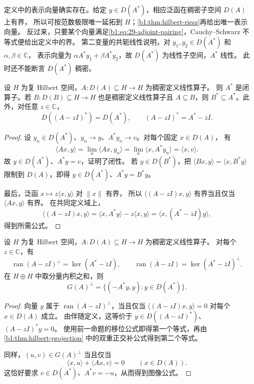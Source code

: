 定义中的表示向量确实存在。给定 \(y\in D(A^*)\)，相应泛函在稠密子空间 \(D(A)\) 上有界，
所以可按范数极限唯一延拓到 \(H\)；\cref{b1:thm:hilbert-riesz}再给出唯一表示向量。
反过来，只要某个向量满足\eqref{b1:eq:29-adjoint-pairing}，Cauchy--Schwarz 不等式便给出定义中的界。
第二变量的共轭线性说明，对 \(y_1,y_2\in D(A^*)\) 和 \(\alpha,\beta\in\mathbb C\)，
表示向量为 \(\alpha A^*y_1+\beta A^*y_2\)，故 \(D(A^*)\) 为线性子空间，\(A^*\) 线性。
此时还不能断言 \(D(A^*)\) 稠密。

\begin{proposition}[伴随的闭性与扩张反向性]
\label{b1:prop:29-adjoint-closed}
设 \(H\) 为复 Hilbert 空间，\(A:D(A)\subseteq H\to H\) 为稠密定义线性算子。
则 \(A^*\) 是闭算子。若 \(B:D(B)\subseteq H\to H\) 也是稠密定义线性算子且
\(A\subseteq B\)，则 \(B^*\subseteq A^*\)。此外，对任意 \(z\in\mathbb C\)，
\[
 D((A-zI)^*)=D(A^*),\qquad (A-zI)^*=A^*-\overline zI.
\]
\end{proposition}
\begin{proof}
设 \(y_n\in D(A^*)\)、\(y_n\to y\)、\(A^*y_n\to v\)。对每个固定 \(x\in D(A)\)，
有
\[
 \langle Ax,y\rangle=\lim_n\langle Ax,y_n\rangle
 =\lim_n\langle x,A^*y_n\rangle=\langle x,v\rangle.
\]
故 \(y\in D(A^*)\)、\(A^*y=v\)，证明了闭性。
若 \(y\in D(B^*)\)，把 \(\langle Bx,y\rangle=\langle x,B^*y\rangle\)
限制到 \(D(A)\)，即得 \(y\in D(A^*)\)、\(A^*y=B^*y\)。

最后，泛函 \(x\mapsto z\langle x,y\rangle\) 对 \(\|x\|\) 有界，
所以 \(\langle(A-zI)x,y\rangle\) 有界当且仅当 \(\langle Ax,y\rangle\) 有界。
在共同定义域上，
\[
 \langle(A-zI)x,y\rangle
 =\langle x,A^*y\rangle-z\langle x,y\rangle
 =\langle x,(A^*-\overline zI)y\rangle,
\]
得到所需公式。
\end{proof}

\begin{proposition}[核、值域与图像的正交关系]
\label{b1:prop:29-adjoint-range}
设 \(H\) 为复 Hilbert 空间，\(A:D(A)\subseteq H\to H\) 为稠密定义线性算子。
对每个 \(z\in\mathbb C\)，有
\begin{equation}\label{b1:eq:29-range-kernel}
 \operatorname{ran}(A-zI)^\perp=\ker(A^*-\overline zI),\qquad
 \overline{\operatorname{ran}(A-zI)}
 =\ker(A^*-\overline zI)^\perp.
\end{equation}
在 \(H\oplus H\) 中取分量内积之和，则
\begin{equation}\label{b1:eq:29-graph-orthogonal}
 G(A)^\perp=\{(-A^*y,y):y\in D(A^*)\}.
\end{equation}
\end{proposition}
\begin{proof}
向量 \(y\) 属于 \(\operatorname{ran}(A-zI)^\perp\)，当且仅当
\(\langle(A-zI)x,y\rangle=0\) 对每个 \(x\in D(A)\) 成立。
由伴随定义，这等价于 \(y\in D((A-zI)^*)\)、\((A-zI)^*y=0\)。
使用前一命题的移位公式即得第一个等式，再由\cref{b1:thm:hilbert-projection}
中的双重正交补公式得到第二个等式。

同样，\((u,v)\in G(A)^\perp\) 当且仅当
\[
 \langle x,u\rangle+\langle Ax,v\rangle=0\qquad(x\in D(A)).
\]
这恰好要求 \(v\in D(A^*)\)、\(A^*v=-u\)，从而得到图像公式。
\end{proof}

